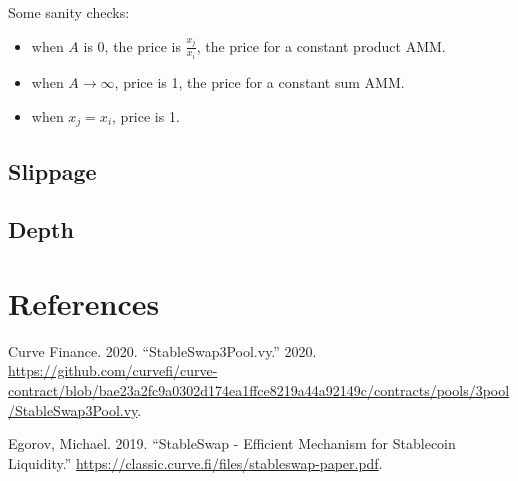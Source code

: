 \documentclass[
]{article}
\providecommand{\tightlist}{%
  \setlength{\itemsep}{0pt}\setlength{\parskip}{0pt}}
\newlength{\cslhangindent}
\newlength{\cslentryspacingunit} %
\newenvironment{CSLReferences}[2] %
 {%
  \setlength{\parindent}{0pt}
  \ifodd #1
  \let\oldpar\par
  \def\par{\hangindent=\cslhangindent\oldpar}
  \fi
  \setlength{\parskip}{#2\cslentryspacingunit}
 }%
 {}
\begin{document}
Some sanity checks:

\begin{itemize}
\tightlist
\item
  when \(A\) is 0, the price is \(\frac{x_j}{x_i}\), the price for a
  constant product AMM.
\item
  when \(A \rightarrow \infty\), price is 1, the price for a constant
  sum AMM.
\item
  when \(x_j = x_i\), price is 1.
\end{itemize}

\hypertarget{slippage}{%
\subsection{Slippage}\label{slippage}}

\hypertarget{depth}{%
\subsection{Depth}\label{depth}}

\hypertarget{references}{%
\section*{References}\label{references}}

\hypertarget{refs}{}
\begin{CSLReferences}{1}{0}
\leavevmode{}%
Curve Finance. 2020. {``StableSwap3Pool.vy.''} 2020.
\url{https://github.com/curvefi/curve-contract/blob/bae23a2fc9a0302d174ea1ffce8219a44a92149c/contracts/pools/3pool/StableSwap3Pool.vy}.

\leavevmode{}%
Egorov, Michael. 2019. {``StableSwap - Efficient Mechanism for
Stablecoin Liquidity.''}
\url{https://classic.curve.fi/files/stableswap-paper.pdf}.

\end{CSLReferences}
\end{document}
